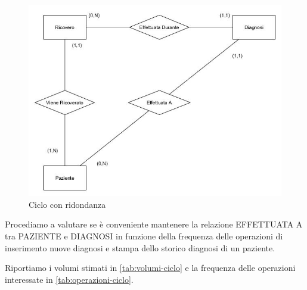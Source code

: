 \documentclass{article}
\begin{document}
\begin{figure}[H] %
	\centering
	\includegraphics[width=\linewidth]{schema3.jpg}
	\caption{Ciclo con ridondanza}
	\label{fig:ciclo-ridondanza}
\end{figure}
Procediamo a valutare se è conveniente mantenere la relazione EFFETTUATA A tra PAZIENTE e DIAGNOSI in funzione della frequenza delle operazioni di inserimento nuove diagnosi e stampa dello storico diagnosi di un paziente.


Riportiamo i volumi stimati in \autoref{tab:volumi-ciclo} e la frequenza delle operazioni interessate in \autoref{tab:operazioni-ciclo}.
\end{document}
